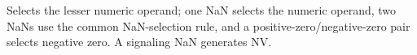 Selects the lesser numeric operand; one NaN selects the numeric operand, two NaNs use the common NaN-selection rule, and a positive-zero/negative-zero pair selects negative zero. A signaling NaN generates NV.
